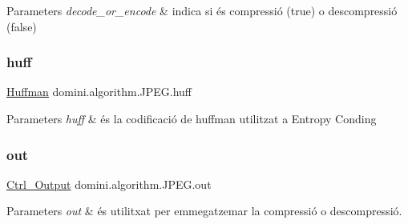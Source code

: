 \begin{DoxyParams}{Parameters}
{\em decode\+\_\+or\+\_\+encode} & indica si és compressió (true) o descompressió (false) \\
\hline
\end{DoxyParams}
\mbox{\label{classdomini_1_1algorithm_1_1JPEG_aacc6445baa7819e3f9139ffb78e0b8f4}} 
\subsubsection{\texorpdfstring{huff}{huff}}
{\footnotesize\ttfamily \hyperlink{classdomini_1_1algorithm_1_1Huffman}{Huffman} domini.\+algorithm.\+J\+P\+E\+G.\+huff\hspace{0.3cm}{\ttfamily [package]}}


\begin{DoxyParams}{Parameters}
{\em huff} & és la codificació de huffman utilitzat a Entropy Conding \\
\hline
\end{DoxyParams}
\mbox{\label{classdomini_1_1algorithm_1_1JPEG_a2512a38136dac55fa5dbbfc8f0ae822d}} 
\subsubsection{\texorpdfstring{out}{out}}
{\footnotesize\ttfamily \hyperlink{classpersistencia_1_1output_1_1Ctrl__Output}{Ctrl\+\_\+\+Output} domini.\+algorithm.\+J\+P\+E\+G.\+out\hspace{0.3cm}{\ttfamily [package]}}


\begin{DoxyParams}{Parameters}
{\em out} & és utilitxat per emmegatzemar la compressió o descompressió. \\
\hline
\end{DoxyParams}
\mbox{\label{classdomini_1_1algorithm_1_1JPEG_a68d523efc6a9dfb3dd2edec0bbb79b48}} 
